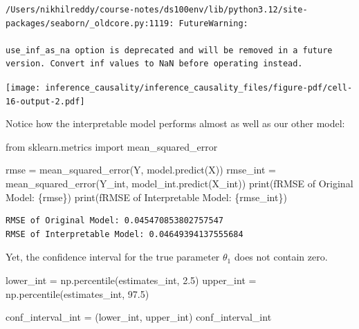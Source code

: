 \documentclass[
  letterpaper,
  DIV=11,
  numbers=noendperiod]{scrreprt}
\newenvironment{Shaded}{\begin{snugshade}}{\end{snugshade}}
\newcommand{\BuiltInTok}[1]{\textcolor[rgb]{0.00,0.23,0.31}{#1}}
\newcommand{\FloatTok}[1]{\textcolor[rgb]{0.68,0.00,0.00}{#1}}
\newcommand{\ImportTok}[1]{\textcolor[rgb]{0.00,0.46,0.62}{#1}}
\newcommand{\NormalTok}[1]{\textcolor[rgb]{0.00,0.23,0.31}{#1}}
\newcommand{\OperatorTok}[1]{\textcolor[rgb]{0.37,0.37,0.37}{#1}}
\newcommand{\SpecialCharTok}[1]{\textcolor[rgb]{0.37,0.37,0.37}{#1}}
\newcommand{\SpecialStringTok}[1]{\textcolor[rgb]{0.13,0.47,0.30}{#1}}
\begin{document}
\begin{verbatim}
/Users/nikhilreddy/course-notes/ds100env/lib/python3.12/site-packages/seaborn/_oldcore.py:1119: FutureWarning:

use_inf_as_na option is deprecated and will be removed in a future version. Convert inf values to NaN before operating instead.
\end{verbatim}

\texttt{[image: inference\_causality/inference\_causality\_files/figure-pdf/cell-16-output-2.pdf]}

Notice how the interpretable model performs almost as well as our other
model:

\begin{Shaded}
\begin{Highlighting}[]
\ImportTok{from}\NormalTok{ sklearn.metrics }\ImportTok{import}\NormalTok{ mean\_squared\_error}

\NormalTok{rmse }\OperatorTok{=}\NormalTok{ mean\_squared\_error(Y, model.predict(X))}
\NormalTok{rmse\_int }\OperatorTok{=}\NormalTok{ mean\_squared\_error(Y\_int, model\_int.predict(X\_int))}
\BuiltInTok{print}\NormalTok{(}\SpecialStringTok{f\textquotesingle{}RMSE of Original Model: }\SpecialCharTok{\{}\NormalTok{rmse}\SpecialCharTok{\}}\SpecialStringTok{\textquotesingle{}}\NormalTok{)}
\BuiltInTok{print}\NormalTok{(}\SpecialStringTok{f\textquotesingle{}RMSE of Interpretable Model: }\SpecialCharTok{\{}\NormalTok{rmse\_int}\SpecialCharTok{\}}\SpecialStringTok{\textquotesingle{}}\NormalTok{)}
\end{Highlighting}
\end{Shaded}

\begin{verbatim}
RMSE of Original Model: 0.045470853802757547
RMSE of Interpretable Model: 0.04649394137555684
\end{verbatim}

Yet, the confidence interval for the true parameter \(\theta_{1}\) does
not contain zero.

\begin{Shaded}
\begin{Highlighting}[]
\NormalTok{lower\_int }\OperatorTok{=}\NormalTok{ np.percentile(estimates\_int, }\FloatTok{2.5}\NormalTok{)}
\NormalTok{upper\_int }\OperatorTok{=}\NormalTok{ np.percentile(estimates\_int, }\FloatTok{97.5}\NormalTok{)}

\NormalTok{conf\_interval\_int }\OperatorTok{=}\NormalTok{ (lower\_int, upper\_int)}
\NormalTok{conf\_interval\_int}
\end{Highlighting}
\end{Shaded}
\end{document}
